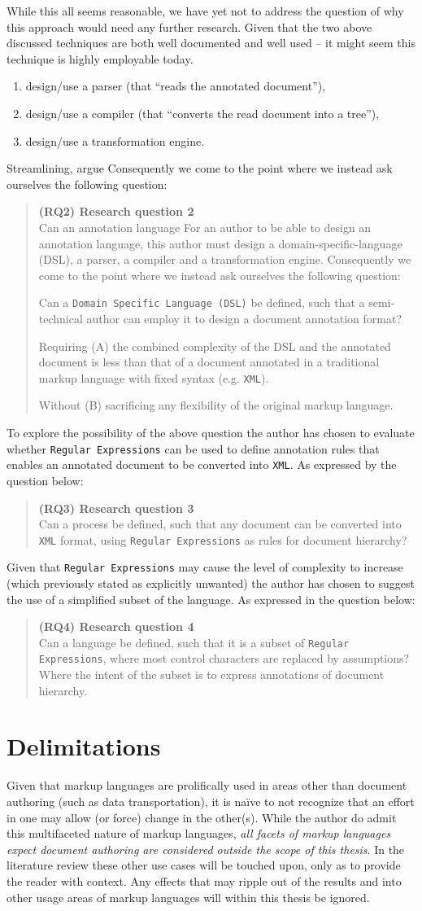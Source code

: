 \documentclass{scrreprt}
\newcommand\researchquestionformat[1]{\begin{quote}#1\end{quote}}
\newcommand\secondresearchquestion{\researchquestionformat{%
  \textbf{(RQ2) Research question 2} \\
  Can an annotation language
  For an author to be able to design an annotation language, this author must design a domain-specific-language (DSL), a parser, a compiler and a transformation engine. Consequently we come to the point where we instead ask ourselves the following question:


  Can a \texttt{Domain Specific Language (DSL)} be defined, such that a semi-technical author can employ it to design a document annotation format?

  Requiring (A) the combined complexity of the DSL and the annotated document is less than that of a document annotated in a traditional markup language with fixed syntax (e.g. \texttt{XML}).

  Without (B) sacrificing any flexibility of the original markup language.
}}
\newcommand\thirdresearchquestion{\researchquestionformat{%
  \textbf{(RQ3) Research question 3} \\
  Can a process be defined, such that any document can be converted into \texttt{XML} format, using \texttt{Regular Expressions} as rules for document hierarchy?
}}
\newcommand\fourthresearchquestion{\researchquestionformat{%
  \textbf{(RQ4) Research question 4} \\
  Can a language be defined, such that it is a subset of \texttt{Regular Expressions}, where most control characters are replaced by assumptions? Where the intent of the subset is to express annotations of document hierarchy.
}}
\begin{document}
While this all seems reasonable, we have yet not to address the question of why this approach would need any further research. Given that the two above discussed techniques are both well documented and well used -- it might seem this technique is highly employable today.

\begin{enumerate}
\item design/use a parser (that ``reads the annotated document''),
\item design/use a compiler (that ``converts the read document into a tree''),
\item design/use a transformation engine.
\end{enumerate}


Streamlining,   argue  Consequently we come to the point where we instead ask ourselves the following question:

\secondresearchquestion

To explore the possibility of the above question the author has chosen to evaluate whether \texttt{Regular Expressions} can be used to define annotation rules that enables an annotated document to be converted into \texttt{XML}. As expressed by the question below:

\thirdresearchquestion

Given that \texttt{Regular Expressions} may cause the level of complexity to increase (which previously stated as explicitly unwanted) the author has chosen to suggest the use of a simplified subset of the language. As expressed in the question below:

\fourthresearchquestion


\section{Delimitations}
Given that markup languages are prolifically used in areas other than document authoring (such as data transportation), it is naïve to not recognize that an effort in one may allow (or force) change in the other(s). While the author do admit this multifaceted nature of markup languages, \emph{all facets of markup languages expect document authoring are considered outside the scope of this thesis}. In the literature review these other use cases will be touched upon, only as to provide the reader with context. Any effects that may ripple out of the results and into other usage areas of markup languages will within this thesis be ignored. 
\end{document}
